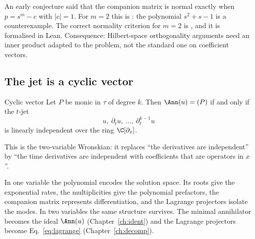 \begin{caution}[title={The companion matrix is not normal in general}]
An early conjecture said that the companion matrix is normal exactly when $p=s^m-c$ with $|c|=1$. For $m=2$ this is \falsest: the polynomial $s^2+s-1$ is a counterexample. The correct normality criterion for $m=2$ is  \proved{}, and it is formalised in Lean. Consequence: Hilbert-space orthogonality arguments need an inner product adapted to the problem, not the standard one on coefficient vectors.
\end{caution}

\subsection{The jet is a cyclic vector}

\begin{proposition}{Cyclic vector  \proved}\label{prop:cyclic}
Let $P$ be monic in $\tau$ of degree $k$. Then $\Ann(u)=(P)$ if and only if the $t$-jet
\[
u,\ \partial_tu,\ \dots,\ \partial_t^{k-1}u
\]
is linearly independent over the ring $\C[\partial_x]$.

\end{proposition}

This is the two-variable Wronskian: it replaces ``the derivatives are independent'' by ``the time derivatives are independent with coefficients that are operators in $x$''.

\begin{keypoint}
In one variable the polynomial encodes the solution space. Its roots give the exponential rates, the multiplicities give the polynomial prefactors, the companion matrix represents differentiation, and the Lagrange projectors isolate the modes. In two variables the same structure survives. The minimal annihilator becomes the ideal $\Ann(u)$ (Chapter~\ref{ch:ident}) and the Lagrange projectors become Eq.~\eqref{eq:lagrange} (Chapter~\ref{ch:decomp}).
\end{keypoint}
